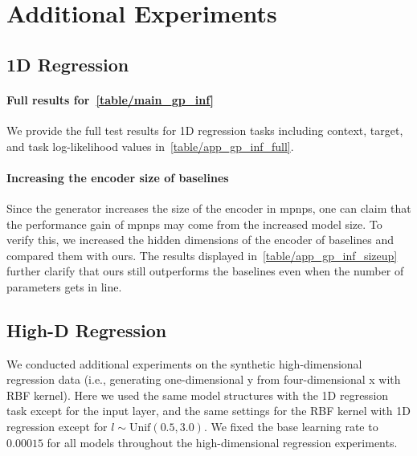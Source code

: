 \section{Additional Experiments}
\label{app:sec:additional_experiments}
\subsection{1D Regression}
\label{app:sec:additional_experiments:1dregression}


\paragraph{Full results for~\cref{table/main_gp_inf}}
We provide the full test results for 1D regression tasks including context, target, and task log-likelihood values in~\cref{table/app_gp_inf_full}.

\paragraph{Increasing the encoder size of baselines}

Since the generator increases the size of the encoder in \glspl{mpnp}, one can claim that the performance gain of \glspl{mpnp} may come from the increased model size. To verify this, we increased the hidden dimensions of the encoder of baselines and compared them with ours. The results displayed in~\cref{table/app_gp_inf_sizeup} further clarify that ours still outperforms the baselines even when the number of parameters gets in line.


\subsection{High-D Regression}
We conducted additional experiments on the synthetic high-dimensional regression data (i.e., generating one-dimensional y from four-dimensional x with RBF kernel). Here we used the same model structures with the 1D regression task except for the input layer, and the same settings for the RBF kernel with 1D regression except for $l\sim \text{Unif}(0.5, 3.0)$. We fixed the base learning rate to $0.00015$ for all models throughout the high-dimensional regression experiments.


